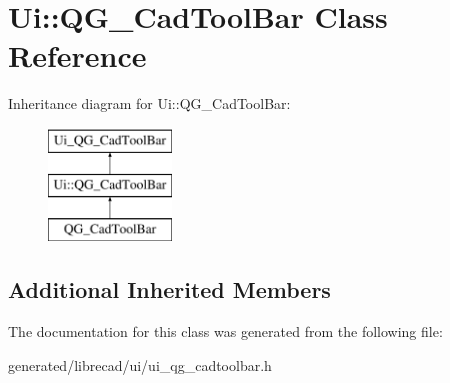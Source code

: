 \hypertarget{classUi_1_1QG__CadToolBar}{\section{Ui\-:\-:Q\-G\-\_\-\-Cad\-Tool\-Bar Class Reference}
\label{classUi_1_1QG__CadToolBar}
}
Inheritance diagram for Ui\-:\-:Q\-G\-\_\-\-Cad\-Tool\-Bar\-:\begin{figure}[H]
\begin{center}
\leavevmode
\includegraphics[height=3.000000cm]{classUi_1_1QG__CadToolBar}
\end{center}
\end{figure}
\subsection*{Additional Inherited Members}


The documentation for this class was generated from the following file\-:\begin{DoxyCompactItemize}
\item 
generated/librecad/ui/ui\-\_\-qg\-\_\-cadtoolbar.\-h\end{DoxyCompactItemize}
